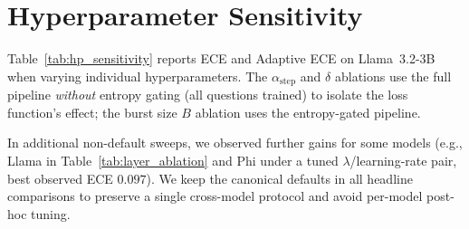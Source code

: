 \section{Hyperparameter Sensitivity} \label{app:hp_sensitivity}

Table~\ref{tab:hp_sensitivity} reports ECE and Adaptive ECE on 
Llama~3.2-3B when varying individual hyperparameters.
The $\alpha_{\text{step}}$ and $\delta$ ablations use the full pipeline 
\emph{without} entropy gating (all questions trained) to isolate the loss 
function's effect; the burst size $B$ ablation uses the entropy-gated pipeline.

\begin{table}[htbp]
\centering
\small
{}%
\caption{Hyperparameter sensitivity (Llama~3.2-3B).
Bold indicates the selected configuration.
$^\dagger$Without entropy gating.
$^\ddagger$With entropy gating.}
\label{tab:hp_sensitivity}
\end{table}

In additional non-default sweeps, we observed further gains for some models
(e.g., Llama in Table~\ref{tab:layer_ablation} and Phi under a tuned
$\lambda$/learning-rate pair, best observed ECE $0.097$). We keep the canonical
defaults in all headline comparisons to preserve a single cross-model protocol
and avoid per-model post-hoc tuning.


